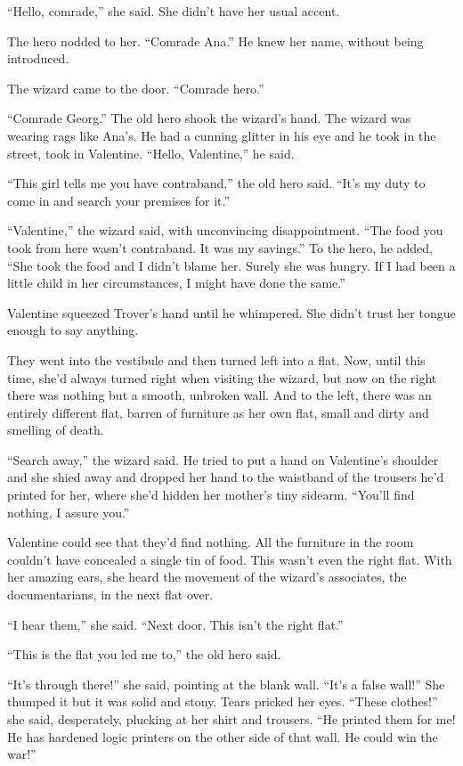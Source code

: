 “Hello, comrade,” she said. She didn’t have her usual accent.

The hero nodded to her. “Comrade Ana.” He knew her name, without
being introduced.

The wizard came to the door. “Comrade hero.”

“Comrade Georg.” The old hero shook the wizard’s hand. The wizard
was wearing rags like Ana’s. He had a cunning glitter in his eye
and he took in the street, took in Valentine. “Hello, Valentine,”
he said.

“This girl tells me you have contraband,” the old hero said. “It’s
my duty to come in and search your premises for it.”

“Valentine,” the wizard said, with unconvincing disappointment.
“The food you took from here wasn’t contraband. It was my savings.”
To the hero, he added, “She took the food and I didn’t blame her.
Surely she was hungry. If I had been a little child in her
circumstances, I might have done the same.”

Valentine squeezed Trover’s hand until he whimpered. She didn’t
trust her tongue enough to say anything.

They went into the vestibule and then turned left into a flat. Now,
until this time, she’d always turned right when visiting the
wizard, but now on the right there was nothing but a smooth,
unbroken wall. And to the left, there was an entirely different
flat, barren of furniture as her own flat, small and dirty and
smelling of death.

“Search away,” the wizard said. He tried to put a hand on
Valentine’s shoulder and she shied away and dropped her hand to the
waistband of the trousers he’d printed for her, where she’d hidden
her mother’s tiny sidearm. “You’ll find nothing, I assure you.”

Valentine could see that they’d find nothing. All the furniture in
the room couldn’t have concealed a single tin of food. This wasn’t
even the right flat. With her amazing ears, she heard the movement
of the wizard’s associates, the documentarians, in the next flat
over.

“I hear them,” she said. “Next door. This isn’t the right flat.”

“This is the flat you led me to,” the old hero said.

“It’s through there!” she said, pointing at the blank wall. “It’s a
false wall!” She thumped it but it was solid and stony. Tears
pricked her eyes. “These clothes!” she said, desperately, plucking
at her shirt and trousers. “He printed them for me! He has hardened
logic printers on the other side of that wall. He could win the
war!”


